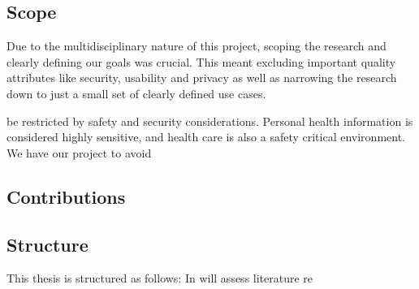 \subsection{Scope} 

\label{sub:scope}

Due to the multidisciplinary nature of this project, scoping the research and clearly defining our goals was crucial. This meant excluding important quality attributes like security, usability and privacy as well as narrowing the research down to just a small set of clearly defined use cases.

be restricted by safety and security considerations. Personal health information is considered highly sensitive, and health care is also a safety critical environment. We have our project to avoid 

\subsection{Contributions} 

\label{sub:contributions}

\subsection{Structure} 

This thesis is structured as follows: In  will assess literature re

\label{sub:structure}

